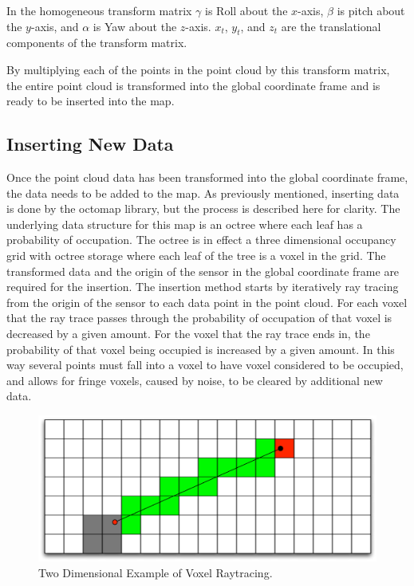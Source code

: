 \documentclass[12pt]{report}
\begin{document}
In the homogeneous transform matrix $\gamma$ is Roll about the $x$-axis, $\beta$ is pitch about the $y$-axis, and $\alpha$ is Yaw about the $z$-axis.  $x_{t}$, $y_{t}$, and $z_{t}$ are the translational components of the transform matrix.

By multiplying each of the points in the point cloud by this transform matrix, the entire point cloud is transformed into the global coordinate frame and is ready to be inserted into the map.

\subsection{Inserting New Data}
Once the point cloud data has been transformed into the global coordinate frame, the data needs to be added to the map. As previously mentioned, inserting data is done by the octomap library, but the process is described here for clarity. The underlying data structure for this map is an octree where each leaf has a probability of occupation. The octree is in effect a three dimensional occupancy grid with octree storage where each leaf of the tree is a voxel in the grid. The transformed data and the origin of the sensor in the global coordinate frame are required for the insertion. The insertion method starts by iteratively ray tracing from the origin of the sensor to each data point in the point cloud.  For each voxel that the ray trace passes through the probability of occupation of that voxel is decreased by a given amount. For the voxel that the ray trace ends in, the probability of that voxel being occupied is increased by a given amount. In this way several points must fall into a voxel to have voxel considered to be occupied, and allows for fringe voxels, caused by noise, to be cleared by additional new data.

\begin{figure}[ht]
  \centering
  \includegraphics[width=5in,keepaspectratio]{raytrace.pdf}
  \caption{Two Dimensional Example of Voxel Raytracing.}
  \label{fig:voxel_raytrace}
\end{figure}
\end{document}
